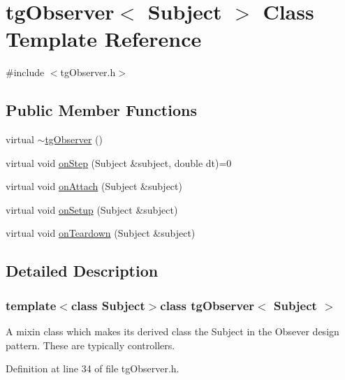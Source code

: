 \hypertarget{classtg_observer}{\section{tg\-Observer$<$ Subject $>$ Class Template Reference}
\label{classtg_observer}
}


{\ttfamily \#include $<$tg\-Observer.\-h$>$}

\subsection*{Public Member Functions}
\begin{DoxyCompactItemize}
\item 
virtual \hyperlink{classtg_observer_a41ba53a117e6fd5ffe3b0ce11f5705fd}{$\sim$tg\-Observer} ()
\item 
virtual void \hyperlink{classtg_observer_a6db5ef1e2792102b8e36dbad5e1a3d7a}{on\-Step} (Subject \&subject, double dt)=0
\item 
virtual void \hyperlink{classtg_observer_a0ecd07483eb41f9a0ab19b8ed24052f1}{on\-Attach} (Subject \&subject)
\item 
virtual void \hyperlink{classtg_observer_ae7b2de87bd4a6e786bc16f1b801c36a6}{on\-Setup} (Subject \&subject)
\item 
virtual void \hyperlink{classtg_observer_a1663edb3732e5ffb7bbe6bfb4ade88b8}{on\-Teardown} (Subject \&subject)
\end{DoxyCompactItemize}


\subsection{Detailed Description}
\subsubsection*{template$<$class Subject$>$class tg\-Observer$<$ Subject $>$}

A mixin class which makes its derived class the Subject in the Obsever design pattern. These are typically controllers. 

Definition at line 34 of file tg\-Observer.\-h.



